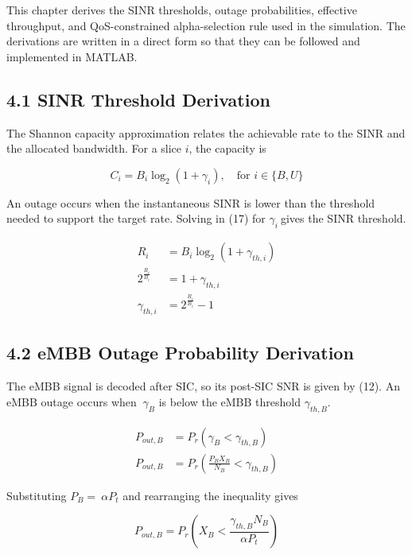 \documentclass[
]{article}
\begin{document}
This chapter derives the SINR thresholds, outage probabilities,
effective throughput, and QoS-constrained alpha-selection rule used in
the simulation. The derivations are written in a direct form so that
they can be followed and implemented in MATLAB.

\subsection{4.1 SINR Threshold
Derivation}\label{sinr-threshold-derivation}
The Shannon capacity approximation relates the achievable rate to the
SINR and the allocated bandwidth. For a slice \(i\), the capacity is

\begin{equation}
C_{i} = B_{i} \log_{2}(1 + \gamma_{i}), \quad \text{for } i \in \{B,U\}
\end{equation}

An outage occurs when the instantaneous SINR is lower than the threshold
needed to support the target rate. Solving in (17) for
\(\gamma_{i}\ \)gives the SINR threshold.

\begin{align}
R_{i} &= B_{i} \log_{2}(1 + \gamma_{th,i}) \\[1ex]
2^{\frac{R_{i}}{B_{i}}} &= 1 + \gamma_{th,i} \\[1ex]
\gamma_{th,i} &= 2^{\frac{R_{i}}{B_{i}}} - 1
\end{align}

\subsection{4.2 eMBB Outage Probability
Derivation}\label{embb-outage-probability-derivation}

The eMBB signal is decoded after SIC, so its post-SIC SNR is
given by (12). An eMBB outage occurs
when \(\ \gamma_{B}\) is below the eMBB threshold \(\gamma_{th,B}\).

\begin{align}
P_{out,B} &= P_{r}\left( \gamma_{B} < \gamma_{th,B} \right) \\[1ex]
P_{out,B} &= P_{r}\left( \frac{P_{B} X_{B}}{N_{B}} < \gamma_{th,B} \right)
\end{align}

Substituting \(P_{B} = \ \alpha P_{t}\) and rearranging the inequality
gives

\begin{equation}
P_{out,B} = P_{r}\left( X_{B} < \frac{\gamma_{th,B} N_{B}}{\alpha P_{t}} \right)
\end{equation}
\end{document}
